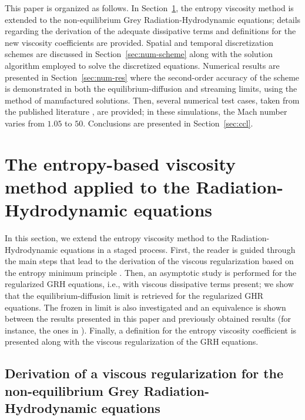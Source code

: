 \documentclass[review]{elsarticle}
\newcommand{\sect}[1]{Section~\ref{#1}}                     %
\begin{document}
This paper is organized as follows. In \sect{sec:entropy-visc-meth}, the entropy viscosity method is extended to the non-equilibrium Grey Radiation-Hydrodynamic equations; details regarding the derivation of the adequate dissipative terms and definitions for the new viscosity coefficients are provided. Spatial and temporal discretization schemes are discussed in \sect{sec:num-scheme} along with the solution algorithm employed to solve the discretized equations. Numerical results are presented in \sect{sec:num-res} where the second-order accuracy of the scheme is demonstrated in both the equilibrium-diffusion and streaming limits, using the method of manufactured solutions. Then, several numerical test cases, taken from the published literature \cite{LowrieEdwards}, are provided; in these simulations, the Mach number varies from $1.05$ to $50$. Conclusions are presented in \sect{sec:ccl}.

\section{The entropy-based viscosity method applied to the Radiation-Hydrodynamic equations}
\label{sec:entropy-visc-meth}

In this section, we extend the entropy viscosity method \cite{jlg1, jlg2, valentin} to the Radiation-Hydrodynamic equations in a staged process. First, the reader is guided through the main steps that lead to the derivation of the viscous regularization based on the entropy minimum principle \cite{entropy}. Then, an asymptotic study is performed for the regularized GRH equations, i.e., with viscous dissipative terms present; we show that the equilibrium-diffusion limit is retrieved for the regularized GHR equations. The frozen in limit is also investigated and an equivalence is shown between the results presented in this paper and previously obtained results (for instance, the ones in \cite{LowrieMorel}). Finally, a definition for the entropy viscosity coefficient is presented along with the viscous regularization of the GRH equations.
 
\subsection{Derivation of a viscous regularization for the non-equilibrium Grey Radiation-Hydrodynamic equations}\label{sec:visc-reg}
\end{document}
